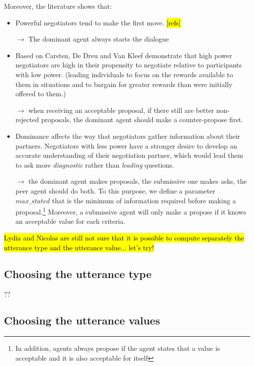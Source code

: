 \documentclass{llncs}
\begin{document}
Moreover, the literature shows that:
\begin{itemize}
	\item Powerful negotiators tend to make the first move. \hl{[refs]}
	
	$\rightarrow$ The dominant agent always starts the dialogue
	
	\item Based on Carsten, De Dreu and Van Kleef demonstrate that high power negotiators are high in their propensity to negotiate relative to participants with low power. (leading individuals to focus on the rewards available to them in situations and to bargain for	greater rewards than were initially offered to them.)
	
	$\rightarrow$ when receiving an acceptable proposal, if there still are better non-rejected proposals, the dominant agent should make a counter-propose first.
	
	\item Dominance affects the way that negotiators gather information about their partners. Negotiators with less power have a stronger desire to develop an accurate understanding of their negotiation partner, which would lead them to ask more \emph{diagnostic} rather than \emph{leading} questions.
	
	$\rightarrow$ the dominant agent makes proposals, the submissive one makes asks, the peer agent should do both. To this purpose, we define a parameter $max\_stated$ that is the minimum of information required before making a proposal.\footnote{In addition, agents always propose if the agent states that a value is acceptable and it is also acceptable for itself} Moreover, a submissive agent will only make a propose if it knows an acceptable value for each criteria.
\end{itemize} 


\hl{Lydia and Nicolas are still not sure that it is possible to compute separately the utterance type and the utterance value... let's try!}

\subsection{Choosing the utterance type}

??


\subsection{Choosing the utterance values}
\end{document}
